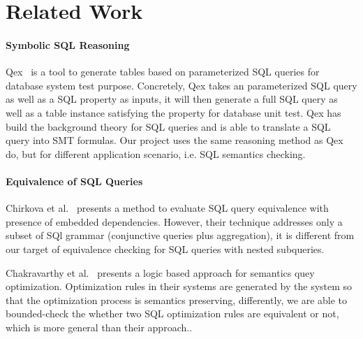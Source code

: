 \documentclass{article}
\begin{document}
\section{Related Work}

\paragraph{Symbolic SQL Reasoning} Qex~\cite{veanes2010qex,veanes2009symbolic} is a tool to generate tables based on parameterized SQL queries for database system test purpose. Concretely, Qex takes an parameterized SQL query as well as a SQL property as inputs, it will then generate a full SQL query as well as a table instance satisfying the property for database unit test. Qex has build the background theory for SQL queries and is able to translate a SQL query into SMT formulas. Our project uses the same reasoning method as Qex do, but for different application scenario, i.e. SQL semantics checking.

\paragraph{Equivalence of SQL Queries} Chirkova et al.~\cite{chirkova2009equivalence} presents a method to evaluate SQL query equivalence with presence of embedded dependencies. However, their technique addresses only a subset of SQl grammar (conjunctive queries plus aggregation), it is different from our target of equivalence checking for SQL queries with nested subqueries. 

Chakravarthy et al.~\cite{Chakravarthy:1990:LAS:78922.78924} presents a logic based approach for semantics quey optimization. Optimization rules in their systems are generated by the system so that the optimization process is semantics preserving, differently, we are able to bounded-check the whether two SQL optimization rules are equivalent or not, which is more general than their approach..

{}

\end{document}

